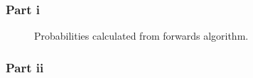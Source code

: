 \documentclass[12pt]{article} %
\begin{document}
\subsubsection{Part i}
\begin{figure}[H]
	\vspace{-10mm}
	\caption{Probabilities calculated from forwards algorithm.}
\end{figure}

\subsubsection{Part ii}
\end{document}
